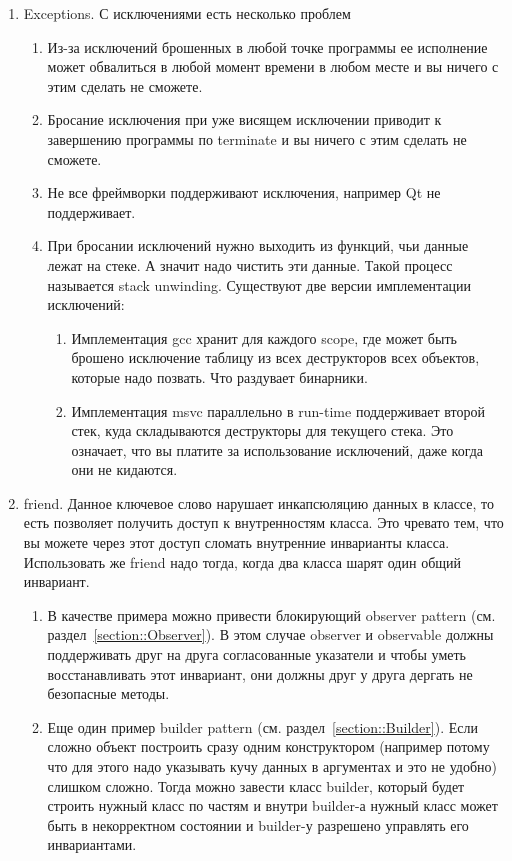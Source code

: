 \begin{enumerate}
\item Exceptions.
С исключениями есть несколько проблем
\begin{enumerate}
\item Из-за исключений брошенных в любой точке программы ее исполнение может обвалиться в любой момент времени в любом месте и вы ничего с этим сделать не сможете.

\item Бросание исключения при уже висящем исключении приводит к завершению программы по terminate и вы ничего с этим сделать не сможете.

\item Не все фреймворки поддерживают исключения, например Qt не поддерживает.

\item При бросании исключений нужно выходить из функций, чьи данные лежат на стеке.
А значит надо чистить эти данные.
Такой процесс называется stack unwinding.
Существуют две версии имплементации исключений:
\begin{enumerate}
\item Имплементация gcc хранит для каждого scope, где может быть брошено исключение таблицу из всех деструкторов всех объектов, которые надо позвать.
Что раздувает бинарники.

\item Имплементация msvc параллельно в run-time поддерживает второй стек, куда складываются деструкторы для текущего стека.
Это означает, что вы платите за использование исключений, даже когда они не кидаются.
\end{enumerate}
\end{enumerate}

\item friend.
Данное ключевое слово нарушает инкапсюляцию данных в классе, то есть позволяет получить доступ к внутренностям класса.
Это чревато тем, что вы можете через этот доступ сломать внутренние инварианты класса.
Использовать же friend надо тогда, когда два класса шарят один общий инвариант.
\begin{enumerate}
\item В качестве примера можно привести блокирующий observer pattern (см. раздел~\ref{section::Observer}).
В этом случае observer и observable должны поддерживать друг на друга согласованные указатели и чтобы уметь восстанавливать этот инвариант, они должны друг у друга дергать не безопасные методы.

\item Еще один пример builder pattern (см. раздел~\ref{section::Builder}).
Если сложно объект построить сразу одним конструктором (например потому что для этого надо указывать кучу данных в аргументах и это не удобно) слишком сложно.
Тогда можно завести класс builder, который будет строить нужный класс по частям и внутри builder-а нужный класс может быть в некорректном состоянии и builder-у разрешено управлять его инвариантами.
\end{enumerate}


\end{enumerate}
